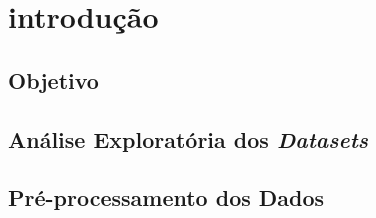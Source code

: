\section{introdução}

\subsection{Objetivo}

\subsection{Análise Exploratória dos \textit{Datasets}}

\subsection{Pré-processamento dos Dados}